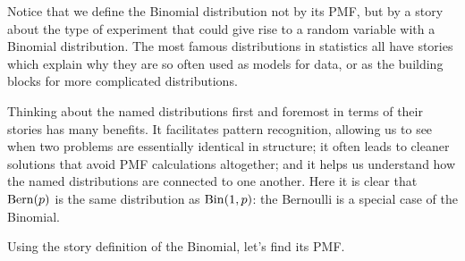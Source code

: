 \documentclass{ccg-topic}
\begin{document}
Notice that we define the Binomial distribution not by its PMF, but by a story about the type of experiment that could give rise to a random variable with a Binomial distribution. The most famous distributions in statistics all have stories which explain why they are so often used as models for data, or as the building blocks for more complicated distributions.

Thinking about the named distributions first and foremost in terms of their stories has many benefits. It facilitates pattern recognition, allowing us to see when two problems are essentially identical in structure; it often leads to cleaner solutions that avoid PMF calculations altogether; and it helps us understand how the named distributions are connected to one another. Here it is clear that $\mathrm{Bern}(p)$ is the same distribution as $\mathrm{Bin}(1, p)$: the Bernoulli is a special case of the Binomial.

Using the story definition of the Binomial, let’s find its PMF.
\end{document}
